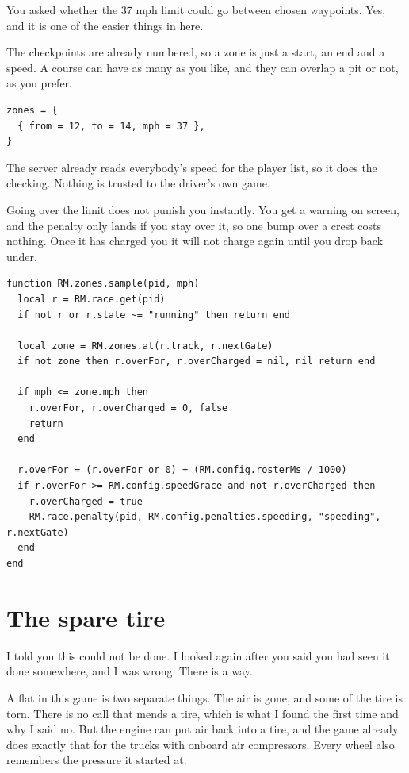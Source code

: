 \documentclass[11pt,a4paper]{article}
\begin{document}
You asked whether the 37 mph limit could go between chosen waypoints. Yes, and
it is one of the easier things in here.

The checkpoints are already numbered, so a zone is just a start, an end and a
speed. A course can have as many as you like, and they can overlap a pit or
not, as you prefer.

\begin{lstlisting}
zones = {
  { from = 12, to = 14, mph = 37 },
}
\end{lstlisting}

The server already reads everybody's speed for the player list, so it does the
checking. Nothing is trusted to the driver's own game.

Going over the limit does not punish you instantly. You get a warning on
screen, and the penalty only lands if you stay over it, so one bump over a
crest costs nothing. Once it has charged you it will not charge again until you
drop back under.

\begin{lstlisting}
function RM.zones.sample(pid, mph)
  local r = RM.race.get(pid)
  if not r or r.state ~= "running" then return end

  local zone = RM.zones.at(r.track, r.nextGate)
  if not zone then r.overFor, r.overCharged = nil, nil return end

  if mph <= zone.mph then
    r.overFor, r.overCharged = 0, false
    return
  end

  r.overFor = (r.overFor or 0) + (RM.config.rosterMs / 1000)
  if r.overFor >= RM.config.speedGrace and not r.overCharged then
    r.overCharged = true
    RM.race.penalty(pid, RM.config.penalties.speeding, "speeding", r.nextGate)
  end
end
\end{lstlisting}

\section{The spare tire}

I told you this could not be done. I looked again after you said you had seen
it done somewhere, and I was wrong. There is a way.

A flat in this game is two separate things. The air is gone, and some of the
tire is torn. There is no call that mends a tire, which is what I found the
first time and why I said no. But the engine can put air back into a tire, and
the game already does exactly that for the trucks with onboard air compressors.
Every wheel also remembers the pressure it started at.
\end{document}
